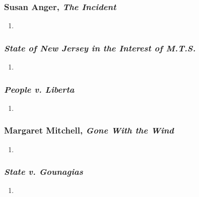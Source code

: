 \subsubsection{Susan Anger, \emph{The Incident}}

\begin{enumerate}
    \item 
\end{enumerate}

\subsubsection{\emph{State of New Jersey in the Interest of M.T.S.}}

\begin{enumerate}
    \item 
\end{enumerate}

\subsubsection{\emph{People v. Liberta}}

\begin{enumerate}
    \item 
\end{enumerate}

\subsubsection{Margaret Mitchell, \emph{Gone With the Wind}}

\begin{enumerate}
    \item 
\end{enumerate}

\subsubsection{\emph{State v. Gounagias}}

\begin{enumerate}
    \item 
\end{enumerate}
